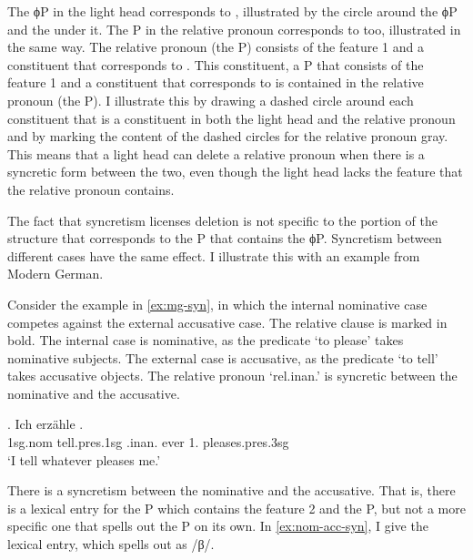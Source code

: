 The ϕP in the light head corresponds to , illustrated by the circle around the ϕP and the  under it. The P in the relative pronoun corresponds to  too, illustrated in the same way.
The relative pronoun (the P) consists of the feature 1 and a constituent that corresponds to . This constituent, a P that consists of the feature 1 and a constituent that corresponds to  is contained in the relative pronoun (the P).
I illustrate this by drawing a dashed circle around each constituent that is a constituent in both the light head and the relative pronoun and by marking the content of the dashed circles for the relative pronoun gray.
This means that a light head can delete a relative pronoun when there is a syncretic form between the two, even though the light head lacks the feature  that the relative pronoun contains.

The fact that syncretism licenses deletion is not specific to the portion of the structure that corresponds to the P that contains the ϕP. Syncretism between different cases have the same effect. I illustrate this with an example from Modern German.

Consider the example in \ref{ex:mg-syn}, in which the internal nominative case competes against the external accusative case. The relative clause is marked in bold.
The internal case is nominative, as the predicate  `to please' takes nominative subjects.
The external case is accusative, as the predicate  `to tell' takes accusative objects.
The relative pronoun  `\ac{rel}.\ac{inan}.' is syncretic between the nominative and the accusative.

\exg. Ich erzähle    .\\
 1\ac{sg}.\ac{nom} tell.\ac{pres}.1\ac{sg}\scsub{[acc]} .\ac{inan}. ever 1. pleases.\ac{pres}.3\ac{sg}\scsub{[nom]}\\
 `I tell whatever pleases me.' \label{ex:mg-syn}

There is a syncretism between the nominative and the accusative. That is, there is a lexical entry for the P which contains the feature 2 and the P, but not a more specific one that spells out the P on its own. In \ref{ex:nom-acc-syn}, I give the lexical entry, which spells out as /β/.

